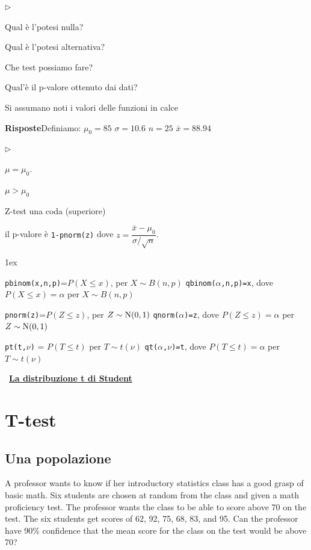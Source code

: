 \documentclass[11pt,openany]{book}
\newcommand{\mylabel}[1]{{\footnotesize\textsf{#1}}\hfill}
\renewenvironment{itemize}
  {\begin{list}{$\triangleright$}{%
   \setlength{\parskip}{0mm}
   \setlength{\topsep}{.2\baselineskip}
   \setlength{\rightmargin}{0mm}
   \setlength{\listparindent}{0mm}
   \setlength{\itemindent}{0mm}
   \setlength{\labelwidth}{3ex}
   \setlength{\itemsep}{.4\baselineskip}
   \setlength{\parsep}{0mm}
   \setlength{\partopsep}{0mm}
   \setlength{\labelsep}{1ex}
   \setlength{\leftmargin}{\labelwidth+\labelsep}
   \let\makelabel\mylabel}}{%
   \end{list}\vspace*{-1.3mm}}
\begin{document}
\begin{itemize}
\item[1.] Qual è l'potesi nulla?

\item[2.] Qual è l'potesi alternativa?

\item[3.] Che test possiamo fare?

\item[4.] Qual'è il p-valore ottenuto dai dati?
\end{itemize}

Si assumano noti i valori delle funzioni in calce

\textbf{Risposte}\quad Definiamo:\quad
$\mu_0=85$\quad
$\sigma=10.6$\quad
$n=25$\quad
$\bar x=88.94$
\begin{itemize}
\item[1.] $\mu=\mu_0$.
\item[2.] $\mu>\mu_0$ 
\item[3.] Z-test una coda (superiore)
\item[4.] il p-valore è {\tt 1-pnorm(z)} dove $z=\dfrac{\bar x-\mu_0}{\sigma/\sqrt{n}}$.
\end{itemize}

\vfill
\parskip1ex
{\hrulefill\scriptsize


{\tt pbinom(x,n,p)}=$P(X\le x)$, per $X\sim B(n,p)$
\hfill 
{\tt qbinom($\alpha$,n,p)=x},  dove $P(X\le x)=\alpha$ per $X\sim B(n,p)$

{\tt pnorm(z)}=$P(Z\le z)$, per $Z\sim {\rm N}(0,1)$
\hfill 
{\tt qnorm($\alpha$)=z},  dove $P(Z\le z)=\alpha$ per $Z\sim {\rm N}(0,1)$

{\tt pt(t,$\nu$)} = $P(T\le t)$ per $T\sim t(\nu)$
\hfill
{\tt qt($\alpha$,$\nu$)=t}, dove $P(T\le t)=\alpha$ per $T\sim t(\nu)$

}



\clearpage\ 
\hfill\textbf{{\color{brown}\hyperref[tStudent]{La distribuzione t di Student \faShare}}}
\section{T-test}
\label{T-test}
\subsection{Una popolazione}
A professor wants to know if her introductory statistics class has a good grasp of basic math. Six students are chosen at random from the class and given a math proficiency test. The professor wants the class to be able to score above 70 on the test. The six students get scores of 62, 92, 75, 68, 83, and 95. Can the professor have 90\%  confidence that the mean score for the class on the test would be above 70?
\end{document}
